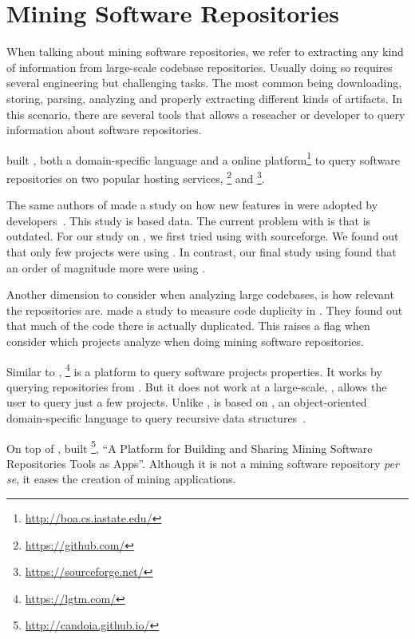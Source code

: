 \section{Mining Software Repositories}

When talking about mining software repositories, we refer to extracting any kind of information from large-scale codebase repositories.
Usually doing so requires several engineering but challenging tasks.
The most common being downloading, storing, parsing, analyzing and properly extracting different kinds of artifacts.
In this scenario, there are several tools that allows a reseacher or developer to query information about software repositories.

\cite{Dyer-Nguyen-Rajan-Nguyen-13, Dyer-Rajan-Nguyen-13} built \boa{}, both a domain-specific language and a online platform\footnote{\url{http://boa.cs.iastate.edu/}} to query software repositories on two popular hosting services, \github{}\footnote{\url{https://github.com/}} and \sourceforge{}\footnote{\url{https://sourceforge.net/}}.

The same authors of \boa{} made a study on how new features in \java{} were adopted by developers~\cite{Dyer-Rajan-Nguyen-Nguyen-14}.
This study is based \sourceforge{} data.
The current problem with \sourceforge{} is that is outdated.
For our study on \smu{}, we first tried using \boa{} with sourceforge{}.
We found out that only few projects were using \smu{}.
In contrast, our final study using \maven{} found that an order of magnitude more were using \smu{}.

Another dimension to consider when analyzing large codebases, is how relevant the repositories are.
\cite{Lopes:2017:DMC:3152284.3133908} made a study to measure code duplicity in \github{}.
They found out that much of the code there is actually duplicated.
This raises a flag when consider which projects analyze when doing mining software repositories.

Similar to \boa{}, \lgtm{}\footnote{\url{https://lgtm.com/}} is a platform to query software projects properties.
It works by querying repositories from \github{}.
But it does not work at a large-scale, \ie{}, \lgtm{} allows the user to query just a few projects.
Unlike \boa{}, \lgtm{} is based on \ql{}, an object-oriented domain-specific language to query recursive data structures~\cite{avgustinov_et_al:LIPIcs:2016:6096}.

On top of \boa{}, \cite{7962355} built \candoia{}\footnote{\url{http://candoia.github.io/}}, ``A Platform for Building and Sharing Mining Software Repositories Tools as Apps''.
Although it is not a mining software repository \emph{per se}, it eases the creation of mining applications.

